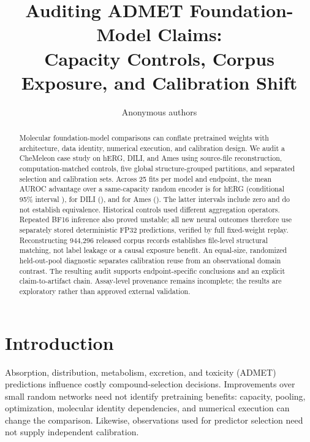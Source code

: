 \documentclass[runningheads,a4paper]{llncs}
\begin{document}
\title{Auditing ADMET Foundation-Model Claims:\\Capacity Controls, Corpus Exposure, and Calibration Shift}
\author{Anonymous authors}
\maketitle
\begin{abstract}
Molecular foundation-model comparisons can conflate pretrained weights with architecture, data identity, numerical execution, and calibration design. We audit a CheMeleon case study on hERG, DILI, and Ames using source-file reconstruction, computation-matched controls, five global structure-grouped partitions, and separated selection and calibration sets. Across 25 fits per model and endpoint, the mean AUROC advantage over a same-capacity random encoder is \HergDelta{} for hERG (conditional 95\% interval \HergCI{}), \DiliDelta{} for DILI (\DiliCI{}), and \AmesDelta{} for Ames (\AmesCI{}). The latter intervals include zero and do not establish equivalence. Historical controls used different aggregation operators. Repeated BF16 inference also proved unstable; all new neural outcomes therefore use separately stored deterministic FP32 predictions, verified by full fixed-weight replay. Reconstructing 944,296 released corpus records establishes file-level structural matching, not label leakage or a causal exposure benefit. An equal-size, randomized held-out-pool diagnostic separates calibration reuse from an observational domain contrast. The resulting audit supports endpoint-specific conclusions and an explicit claim-to-artifact chain. Assay-level provenance remains incomplete; the results are exploratory rather than approved external validation.
\end{abstract}

\section{Introduction}
Absorption, distribution, metabolism, excretion, and toxicity (ADMET) predictions influence costly compound-selection decisions. Improvements over small random networks need not identify pretraining benefits: capacity, pooling, optimization, molecular identity dependencies, and numerical execution can change the comparison. Likewise, observations used for predictor selection need not supply independent calibration.
\end{document}
